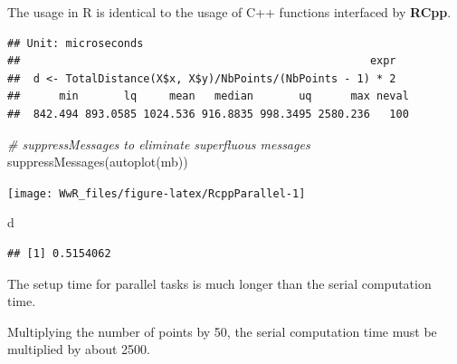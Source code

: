 \documentclass[
  12pt,
  american,
  a4paper,
  extrafontsizes,onecolumn,openright
  ]{memoir}
\newenvironment{Shaded}{\begin{snugshade}}{\end{snugshade}}
\newcommand{\CommentTok}[1]{\textcolor[rgb]{0.56,0.35,0.01}{\textit{#1}}}
\newcommand{\DecValTok}[1]{\textcolor[rgb]{0.00,0.00,0.81}{#1}}
\newcommand{\FunctionTok}[1]{\textcolor[rgb]{0.00,0.00,0.00}{#1}}
\newcommand{\NormalTok}[1]{#1}
\newcommand{\OtherTok}[1]{\textcolor[rgb]{0.56,0.35,0.01}{#1}}
\newcommand{\SpecialCharTok}[1]{\textcolor[rgb]{0.00,0.00,0.00}{#1}}
\newlength{\rf}
\begin{document}
\normalsize

The usage in R is identical to the usage of C++ functions interfaced by \textbf{RCpp}.

\scriptsize

\begin{Shaded}
\end{Shaded}

\begin{verbatim}
## Unit: microseconds
##                                                      expr
##  d <- TotalDistance(X$x, X$y)/NbPoints/(NbPoints - 1) * 2
##      min       lq     mean   median       uq      max neval
##  842.494 893.0585 1024.536 916.8835 998.3495 2580.236   100
\end{verbatim}

\begin{Shaded}
\begin{Highlighting}[]
\CommentTok{\# suppressMessages to eliminate superfluous messages}
\FunctionTok{suppressMessages}\NormalTok{(}\FunctionTok{autoplot}\NormalTok{(mb))}
\end{Highlighting}
\end{Shaded}

\begin{center}\texttt{[image: WwR\_files/figure-latex/RcppParallel-1]} \end{center}

\begin{Shaded}
\begin{Highlighting}[]
\NormalTok{d}
\end{Highlighting}
\end{Shaded}

\begin{verbatim}
## [1] 0.5154062
\end{verbatim}

\normalsize

The setup time for parallel tasks is much longer than the serial computation time.

Multiplying the number of points by 50, the serial computation time must be multiplied by about 2500.
\end{document}
